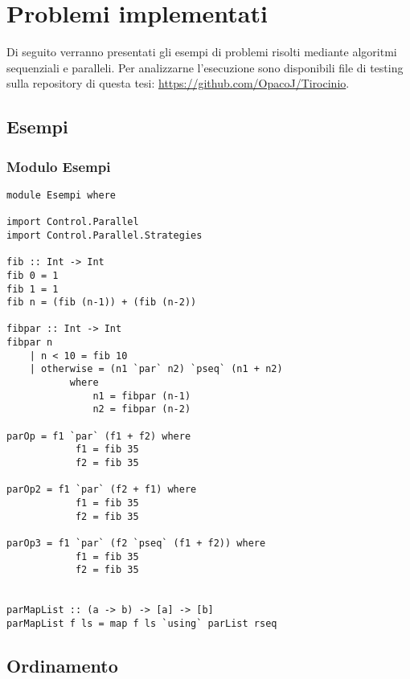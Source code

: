 \chapter{Problemi implementati}
Di seguito verranno presentati gli esempi di problemi risolti mediante algoritmi sequenziali e paralleli. Per analizzarne l'esecuzione sono disponibili file di testing sulla repository di questa tesi: \url{https://github.com/OpacoJ/Tirocinio}.
\section{Esempi}
\subsection{Modulo Esempi}
\begin{verbatim}
module Esempi where

import Control.Parallel
import Control.Parallel.Strategies

fib :: Int -> Int
fib 0 = 1
fib 1 = 1
fib n = (fib (n-1)) + (fib (n-2))

fibpar :: Int -> Int
fibpar n 
    | n < 10 = fib 10
    | otherwise = (n1 `par` n2) `pseq` (n1 + n2)
           where
               n1 = fibpar (n-1)
               n2 = fibpar (n-2)

parOp = f1 `par` (f1 + f2) where
            f1 = fib 35
            f2 = fib 35
            
parOp2 = f1 `par` (f2 + f1) where
            f1 = fib 35
            f2 = fib 35
	        
parOp3 = f1 `par` (f2 `pseq` (f1 + f2)) where
            f1 = fib 35
            f2 = fib 35
            

parMapList :: (a -> b) -> [a] -> [b]
parMapList f ls = map f ls `using` parList rseq

\end{verbatim}

\section{Ordinamento}
